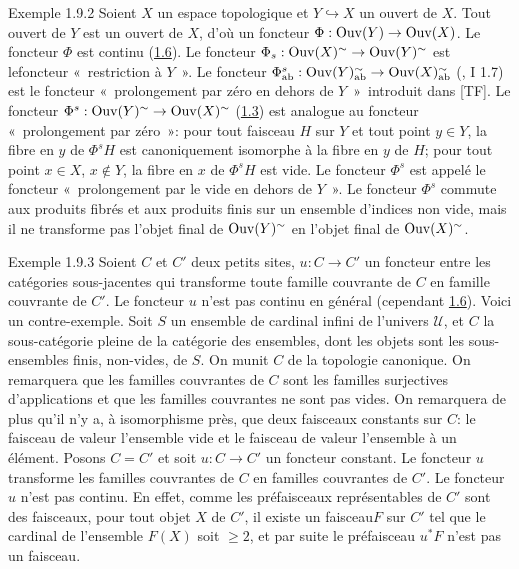 \documentclass[10pt]{../fichiers-configuration-latex/smfart}
\begin{document}
\begin{enonce*}[remark]{Exemple 1.9.2}
Soient $X$ un espace topologique et $Y\hookrightarrow X$ un ouvert
de $X$. Tout ouvert de $Y$ est un ouvert de $X$, d'où un foncteur
$\Phi:\operatorname{Ouv}(Y)\rightarrow \operatorname{Ouv}(X)$. Le foncteur $\Phi$ est continu
(\hyperref[III.prop1.6]{1.6}). Le foncteur $\Phi_s:\operatorname{Ouv}(X)^{\sim}\rightarrow
\operatorname{Ouv}(Y)^{\sim}$ est le\pageoriginale foncteur « restriction à
$Y$ ». Le foncteur $\Phi^s_{\operatorname{ab}}:\operatorname{Ouv}(Y)^{\sim}_{\operatorname{ab}}\rightarrow
\operatorname{Ouv}(X)^{\sim}_{\operatorname{ab}}$ (, I 1.7) est le
foncteur « prolongement par zéro en dehors de $Y$ »\
introduit dans [TF]. Le foncteur $\Phi^s:\operatorname{Ouv}(Y)^{\sim}\rightarrow
\operatorname{Ouv}(X)^{\sim}$ (\hyperref[III.prop1.3]{1.3}) est analogue au foncteur « prolongement par zéro »: pour tout faisceau $H$ sur $Y$ et
tout point $y\in Y$, la fibre en $y$ de $\Phi^sH$ est canoniquement
isomorphe à la fibre en $y$ de $H$; pour tout point $x\in X$,
$x\not\in Y$, la fibre en $x$ de $\Phi^sH$ est vide. Le foncteur
$\Phi^s$ est appelé le foncteur « prolongement par le vide en
dehors de $Y$ ». Le foncteur $\Phi^s$ commute aux produits
fibrés et aux produits finis sur un ensemble d'indices non vide,
mais il ne transforme pas l'objet final de $\operatorname{Ouv}(Y)^{\sim}$ en
l'objet final de $\operatorname{Ouv}(X)^{\sim}$.
\end{enonce*}

\begin{enonce*}[remark]{Exemple 1.9.3}
Soient $C$ et $C'$ deux petits sites, $u:C\rightarrow C'$ un
foncteur entre les catégories sous-jacentes qui transforme toute
famille couvrante de $C$ en famille couvrante de $C'$. Le foncteur
$u$ n'est pas continu en général (\cf cependant
\hyperref[III.prop1.6]{1.6}). Voici un contre-exemple. Soit $S$ un ensemble de
cardinal infini de l'univers $𝒰$, et $C$ la
sous-catégorie pleine de la catégorie des ensembles, dont
les objets sont les sous-ensembles finis, non-vides, de $S$. On
munit $C$ de la topologie canonique. On remarquera que les familles
couvrantes de $C$ sont les familles surjectives d'applications et
que les familles couvrantes ne sont pas vides. On remarquera de plus
qu'il n'y a, à isomorphisme près, que deux faisceaux constants
sur $C$: le faisceau de valeur l'ensemble vide et le faisceau de
valeur l'ensemble à un élément. Posons $C=C'$ et soit
$u:C\rightarrow C'$ un foncteur constant. Le foncteur $u$ transforme
les familles couvrantes de $C$ en familles couvrantes de $C'$. Le
foncteur $u$ n'est pas continu. En effet, comme les préfaisceaux
représentables de $C'$ sont des faisceaux, pour tout objet $X$
de $C'$, il existe un faisceau\pageoriginale $F$ sur $C'$ tel que le
cardinal de l'ensemble $F(X)$ soit $\geq 2$, et par suite le
préfaisceau $u^\ast F$ n'est pas un faisceau.
\end{enonce*}
\end{document}
